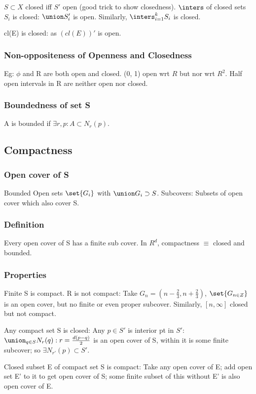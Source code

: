 \documentclass[oneside, article]{memoir}
\begin{document}
$S\subset X$ closed iff $S'$ open (good trick to show closedness). $\inters$ of closed sets $S_{i}$ is closed: $\union S_{i}'$ is open. Similarly, $\inters_{i=1}^{k} S_{i}$ is closed.

cl(E) is closed: as $(cl(E))'$ is open.

\subsubsection{Non-oppositeness of Openness and Closedness}
Eg: $\phi$ and R are both open and closed. (0, 1) open wrt $R$ but nor wrt $R^{2}$. Half open intervals in R are neither open nor closed.

\subsubsection{Boundedness of set S}
A is bounded if $\exists r, p: A \subset N_{r}(p)$.

\subsection{Compactness}
\subsubsection{Open cover of S}
Bounded Open sets $\set{G_{i}}$ with $\union G_{i} \supset S$. Subcovers: Subsets of open cover which also cover S.

\subsubsection{Definition}
Every open cover of S has a finite sub cover. In $R^{d}$, compactness $\equiv$ closed and bounded.

\subsubsection{Properties}
Finite S is compact. R is not compact: Take $G_{n} = (n-\frac{2}{3}, n+\frac{2}{3})$, $\set{G_{n \in Z}}$ is an open cover, but no finite or even proper subcover. Similarly, $[n, \infty]$ closed but not compact.

Any compact set S is closed: Any $p \in S'$ is interior pt in $S'$: $\union_{q \in S} N_{r}(q): r = \frac{d(p-q)}{2}$ is an open cover of S, within it is some finite subcover; so $\exists N_{r'}(p) \subset S'$.

Closed subset E of compact set S is compact: Take any open cover of E; add open set E' to it to get open cover of S; some finite subset of this without E' is also open cover of E.
\end{document}
